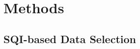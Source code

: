 \section{Methods}
\label{sec:methods}


\subsection{SQI-based Data Selection}
\label{subsec:data-selection}



\cite{Zheng_2021_coma}
